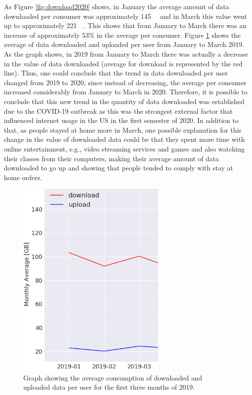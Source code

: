 \documentclass[conference,10pt]{IEEEtran}
\begin{document}
As Figure \ref{fig:download2020} shows, in January the average amount of data downloaded per consumer was approximately \SI{145}{\giga\byte} and in March this value went up to approximately \SI{221}{\giga\byte}. This shows that from January to March there was an increase of approximately 53\% in the average per consumer. Figure \ref{fig:downloadup2019} shows the average of data downloaded and uploaded per user from January to March 2019. As the graph shows, in 2019 from January to March there was actually a decrease in the value of data downloaded (average for download is represented by the red line). Thus, one could conclude that the trend in data downloaded per user changed from 2019 to 2020, since instead of decreasing, the average per consumer increased considerably from January to March in 2020. Therefore, it is possible to conclude that this new trend in the quantity of data downloaded was established due to the COVID-19 outbreak as this was the strongest external factor that influenced internet usage in the US in the first semester of 2020. In addition to that, as people stayed at home more in March, one possible explanation for this change in the value of downloaded data could be that they spent more time with online entertainment, e.g., video streaming services and games and also watching their classes from their computers, making their average amount of data downloaded to go up and showing that people tended to comply with stay at home orders.

\begin{figure}
\centering
\includegraphics[width=0.5\linewidth]{figs/downloadup2019.PNG}
\caption{Graph showing the average consumption of downloaded and uploaded data per user for the first three months of 2019.}
\label{fig:downloadup2019}
\end{figure}
\end{document}
